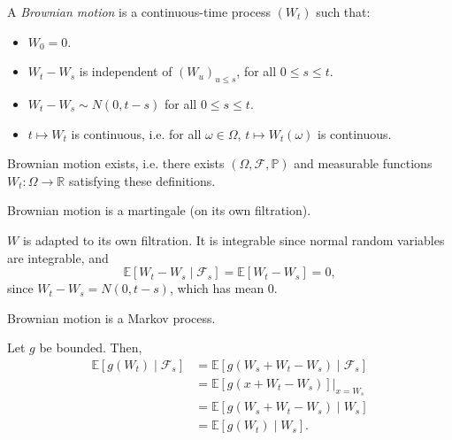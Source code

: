 \documentclass[12pt]{article}
\begin{document}
\begin{definition}
	A \emph{Brownian motion} is a continuous-time process $(W_t)$ such that:
	\begin{itemize}
		\item $W_0 = 0$.
		\item $W_t - W_s$ is independent of $(W_u)_{u \leq s}$, for all $0 \leq s \leq t$.
		\item $W_t - W_s \sim N(0, t-s)$ for all $0 \leq s \leq t$.
		\item $t \mapsto W_t$ is continuous, i.e. for all $\omega \in \Omega$, $t \mapsto W_t(\omega)$ is continuous.
	\end{itemize}
	
\end{definition}

\begin{theorem}[Wiener]
	Brownian motion exists, i.e. there exists $(\Omega, \mathcal{F}, \mathbb{P})$ and measurable functions $W_t : \Omega \to \mathbb{R}$ satisfying these definitions.
\end{theorem}

\begin{proposition}
	Brownian motion is a martingale (on its own filtration).
\end{proposition}

\begin{proofbox}
	$W$ is adapted to its own filtration. It is integrable since normal random variables are integrable, and
	\[
	\mathbb{E}[W_t - W_s \mid \mathcal{F}_s] = \mathbb{E}[W_t - W_s] = 0,
\]
since $W_t - W_s = N(0, t - s)$, which has mean 0.
\end{proofbox}

\begin{proposition}
	Brownian motion is a Markov process.
\end{proposition}

\begin{proofbox}
	Let $g$ be bounded. Then,
	\begin{align*}
		\mathbb{E}[g(W_t) \mid \mathcal{F}_s] &= \mathbb{E}[g(W_s + W_t - W_s) \mid \mathcal{F}_s] \\				      &= \mathbb{E}[g(x + W_t - W_s)] \biggr|_{x = W_s} \\
						      &= \mathbb{E}[g(W_s + W_t - W_s)\mid W_s] \\
						      &= \mathbb{E}[g(W_t) \mid W_s].
	\end{align*}
\end{proofbox}
\end{document}
